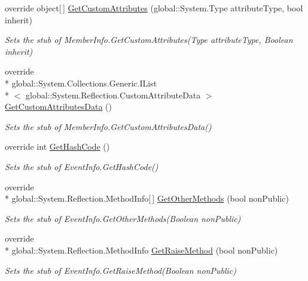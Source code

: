 \begin{DoxyCompactItemize}
override object\mbox{[}$\,$\mbox{]} \hyperlink{class_system_1_1_reflection_1_1_fakes_1_1_stub_event_info_a1d687886d228fd1c1fdc9c3c68ad68fe}{Get\-Custom\-Attributes} (global\-::\-System.\-Type attribute\-Type, bool inherit)
\begin{DoxyCompactList}\small\item\em Sets the stub of Member\-Info.\-Get\-Custom\-Attributes(\-Type attribute\-Type, Boolean inherit)\end{DoxyCompactList}\item 
override \\*
global\-::\-System.\-Collections.\-Generic.\-I\-List\\*
$<$ global\-::\-System.\-Reflection.\-Custom\-Attribute\-Data $>$ \hyperlink{class_system_1_1_reflection_1_1_fakes_1_1_stub_event_info_afdc28645a80e471ffcad039b8b726910}{Get\-Custom\-Attributes\-Data} ()
\begin{DoxyCompactList}\small\item\em Sets the stub of Member\-Info.\-Get\-Custom\-Attributes\-Data()\end{DoxyCompactList}\item 
override int \hyperlink{class_system_1_1_reflection_1_1_fakes_1_1_stub_event_info_a27cf76a3fae0ff704b8ea5bf1a35d04e}{Get\-Hash\-Code} ()
\begin{DoxyCompactList}\small\item\em Sets the stub of Event\-Info.\-Get\-Hash\-Code()\end{DoxyCompactList}\item 
override \\*
global\-::\-System.\-Reflection.\-Method\-Info\mbox{[}$\,$\mbox{]} \hyperlink{class_system_1_1_reflection_1_1_fakes_1_1_stub_event_info_a47f06985b8618f49dc8f9306652a51a4}{Get\-Other\-Methods} (bool non\-Public)
\begin{DoxyCompactList}\small\item\em Sets the stub of Event\-Info.\-Get\-Other\-Methods(\-Boolean non\-Public)\end{DoxyCompactList}\item 
override \\*
global\-::\-System.\-Reflection.\-Method\-Info \hyperlink{class_system_1_1_reflection_1_1_fakes_1_1_stub_event_info_af3d5c9757e63337e141e83f3f346d1e1}{Get\-Raise\-Method} (bool non\-Public)
\begin{DoxyCompactList}\small\item\em Sets the stub of Event\-Info.\-Get\-Raise\-Method(\-Boolean non\-Public)\end{DoxyCompactList}\item 

\end{DoxyCompactItemize}
